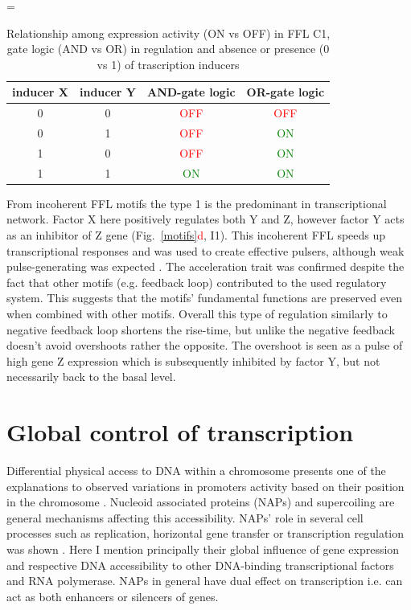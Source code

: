 \begin{center}
\LTcapwidth=\textwidth
	\begin{longtable}[c]{|c|c|c|c|}
\caption{Relationship among expression activity (ON vs OFF) in FFL C1, gate logic (AND vs OR) in regulation and absence or presence (0 vs 1) of trascription inducers} \label{ANDvsOR} \\

\toprule \multicolumn{1}{|c|}{\textbf{inducer X}} & \multicolumn{1}{c|}{\textbf{inducer Y}}  & \multicolumn{1}{c|}{\textbf{AND-gate logic}} & \multicolumn{1}{c|}{\textbf{OR-gate logic}} \\
\midrule
\endhead

\bottomrule
\endlastfoot

0 & 0 & \textcolor{red}{OFF} & \textcolor{red}{OFF} \\
\hline
0 & 1 & \textcolor{red}{OFF} & \textcolor{green}{ON} \\
\hline
1 & 0 & \textcolor{red}{OFF} & \textcolor{green}{ON} \\
\hline
1 & 1 & \textcolor{green}{ON} & \textcolor{green}{ON} \\
	\end{longtable}
\end{center}


From incoherent FFL motifs the type 1 is the predominant in  transcriptional network.
Factor X here positively regulates both Y and Z, however factor Y acts as an inhibitor of Z gene (Fig.~\ref{motifs}\textcolor{red}{d}, I1).
This incoherent FFL speeds up transcriptional responses and was used to create effective pulsers, although weak pulse-generating was expected \cite{mangan2003structure, basu2004spatiotemporal, mangan2006incoherent}.
The acceleration trait was confirmed despite the fact that other motifs (e.g. feedback loop) contributed to the used regulatory system.
This suggests that the motifs' fundamental functions are preserved even when combined with other motifs.
Overall this type of regulation similarly to negative feedback loop shortens the rise-time, but unlike the negative feedback doesn't avoid overshoots rather the opposite.
The overshoot is seen as a pulse of high gene Z expression which is subsequently inhibited by factor Y, but not necessarily back to the basal level.

\section{Global control of transcription}
Differential physical access to DNA within a chromosome presents one of the explanations to observed variations in promoters activity based on their position in the chromosome \cite{bryant2014chromosome}.
Nucleoid associated proteins (NAPs) and supercoiling are general mechanisms affecting this accessibility.
NAPs' role in several cell processes such as replication, horizontal gene transfer or transcription regulation was shown \cite{dixon1984protein, kayoko1992histone, aznar2013hha}.
Here I mention principally their global influence of gene expression and respective DNA accessibility to other DNA-binding transcriptional factors and RNA polymerase.
NAPs in general have dual effect on transcription i.e. can act as both enhancers or silencers of genes.

